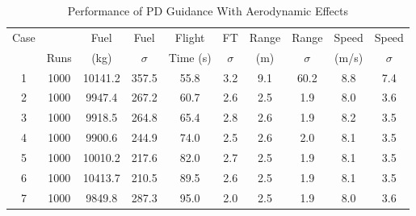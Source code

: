 \begin{table}[ht]                                                                                                  
	\centering        
	\caption{Performance of PD Guidance With Aerodynamic Effects}                                                  
	\label{tab:disppowatmo}                                                                                                
	\begin{tabular}{|c|c|c|c|c|c|c|c|c|c|}                                                                         
		\hline                                                                                                        Case  &      &   Fuel    &    Fuel   & Flight    &   FT     &  Range    &  Range   & Speed   &   Speed  \\ 
		      & Runs & (kg)      & $\sigma$  &  Time (s) & $\sigma$ &  (m) &    $  \sigma$ & (m/s)   & $\sigma$ \\
		\hline                                                                                                        
		1 & 1000 & 10141.2 & 357.5 & 55.8 & 3.2 & 9.1 & 60.2 & 8.8 & 7.4 \\                                            
		\hline                                                                                                        
		2 & 1000 & 9947.4 & 267.2 & 60.7 & 2.6 & 2.5 & 1.9 & 8.0 & 3.6 \\                                              
		\hline                                                                                                        
		3 & 1000 & 9918.5 & 264.8 & 65.4 & 2.8 & 2.6 & 1.9 & 8.2 & 3.5 \\                                              
		\hline                                                                                                        
		4 & 1000 & 9900.6 & 244.9 & 74.0 & 2.5 & 2.6 & 2.0 & 8.1 & 3.5 \\                                              
		\hline                                                                                                        
		5 & 1000 & 10010.2 & 217.6 & 82.0 & 2.7 & 2.5 & 1.9 & 8.1 & 3.5 \\                                             
		\hline                                                                                                        
		6 & 1000 & 10413.7 & 210.5 & 89.5 & 2.6 & 2.5 & 1.9 & 8.1 & 3.5 \\                                             
		\hline                                                                                                        
		7 & 1000 & 9849.8 & 287.3 & 95.0 & 2.0 & 2.5 & 1.9 & 8.0 & 3.6 \\                                              
		\hline                                                                                                        
	\end{tabular}
\end{table}   

